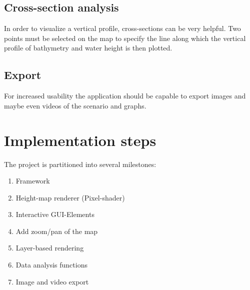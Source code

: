 \documentclass[paper=a4]{article}
\begin{document}
			\subsection*{Cross-section analysis}
				In order to visualize a vertical profile, cross-sections can be very helpful. Two points must be selected on the map to specify the line along which the vertical profile of bathymetry and water height is then plotted.
		\subsection{Export}
			For increased usability the application should be capable to export images and maybe even videos of the scenario and graphs.
	\section{Implementation steps}
		The project is partitioned into several milestones:
		\begin{enumerate}
			\item Framework
			\item Height-map renderer (Pixel-shader)
			\item Interactive GUI-Elements
			\item Add zoom/pan of the map
			\item Layer-based rendering
			\item Data analysis functions
			\item Image and video export
		\end{enumerate}
\end{document}
